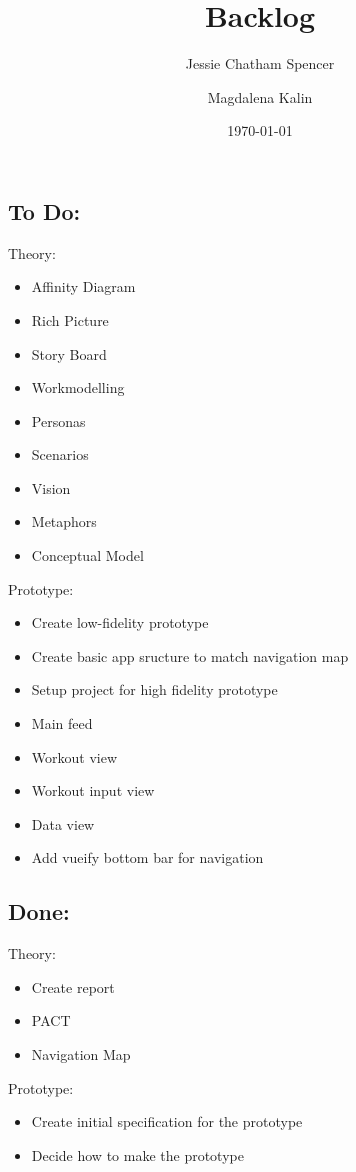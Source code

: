 \documentclass{article}
\title{Backlog}
\author{Jessie Chatham Spencer \and Magdalena Kalin}
\date{\today}
\begin{document}
\maketitle
\subsection*{To Do:}
Theory:
\begin{itemize}
\item Affinity Diagram
\item Rich Picture
\item Story Board
\item Workmodelling
\item Personas
\item Scenarios
\item Vision
\item Metaphors
\item Conceptual Model
\end{itemize}
Prototype:
\begin{itemize}
\item Create low-fidelity prototype
\item Create basic app sructure to match navigation map
\item Setup project for high fidelity prototype
\item Main feed
\item Workout view
\item Workout input view
\item Data view
\item Add vueify bottom bar for navigation
\end{itemize}


\subsection*{Done:}
Theory:
\begin{itemize}
\item Create report
\item PACT 
\item Navigation Map
\end{itemize}
Prototype:
\begin{itemize}
\item Create initial specification for the prototype
\item Decide how to make the prototype
\end{itemize}
\end{document}

